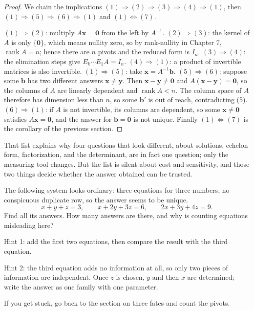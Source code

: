 \begin{proof}
We chain the implications $(1)\Rightarrow(2)\Rightarrow(3)\Rightarrow(4)\Rightarrow(1)$,
then $(1)\Rightarrow(5)\Rightarrow(6)\Rightarrow(1)$ and $(1)\Leftrightarrow(7)$.

$(1)\Rightarrow(2)$: multiply $A\mathbf{x}=\mathbf{0}$ from the left by $A^{-1}$.
$(2)\Rightarrow(3)$: the kernel of $A$ is only $\{\mathbf{0}\}$, which means nullity zero, so by
rank-nullity in Chapter 7, $\operatorname{rank}A=n$; hence there are $n$ pivots and the reduced
form is $I_{n}$. $(3)\Rightarrow(4)$: the elimination steps give $E_{k}\cdots E_{1}A=I_{n}$.
$(4)\Rightarrow(1)$: a product of invertible matrices is also invertible.
$(1)\Rightarrow(5)$: take $\mathbf{x}=A^{-1}\mathbf{b}$. $(5)\Rightarrow(6)$: suppose some
$\mathbf{b}$ has two different answers $\mathbf{x}\neq\mathbf{y}$. Then
$\mathbf{x}-\mathbf{y}\neq\mathbf{0}$ and $A(\mathbf{x}-\mathbf{y})=\mathbf{0}$, so the columns
of $A$ are linearly dependent and $\operatorname{rank}A<n$. The column space of $A$ therefore
has dimension less than $n$, so some $\mathbf{b}'$ is out of reach, contradicting (5).
$(6)\Rightarrow(1)$: if $A$ is not invertible, its columns are dependent, so some
$\mathbf{x}\neq\mathbf{0}$ satisfies $A\mathbf{x}=\mathbf{0}$, and the answer for
$\mathbf{b}=\mathbf{0}$ is not unique. Finally $(1)\Leftrightarrow(7)$ is the corollary of the
previous section.
\end{proof}

That list explains why four questions that look different, about solutions, echelon form,
factorization, and the determinant, are in fact one question; only the measuring tool changes.
But the list is silent about cost and sensitivity, and those two things decide whether the
answer obtained can be trusted.

\begin{tantangan}
The following system looks ordinary: three equations for three numbers, no conspicuous
duplicate row, so the answer seems to be unique.
\[
  x+y+z=3,\qquad x+2y+3z=6,\qquad 2x+3y+4z=9 .
\]
Find all its answers. How many answers are there, and why is counting equations misleading here?

Hint 1: add the first two equations, then compare the result with the third equation.

Hint 2: the third equation adds no information at all, so only two pieces of information are
independent. Once $z$ is chosen, $y$ and then $x$ are determined; write the answer as one family
with one parameter.

If you get stuck, go back to the section on three fates and count the pivots.
\end{tantangan}

